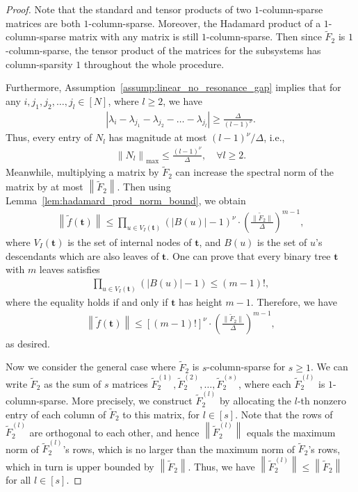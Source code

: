 \documentclass[superscriptaddress,onecolumn,nofootinbib,longbibliography,a4paper,accepted=2026-09-29]{quantumarticle}
\theoremstyle{plain}
\theoremstyle{definition}
\numberwithin{thm}{section}
\numberwithin{assumption}{section}
\numberwithin{lemma}{section}
\numberwithin{prop}{section}
\numberwithin{cor}{section}
\numberwithin{definition}{section}
\numberwithin{rmk}{section}
\numberwithin{equation}{section}
\newcommand{\norm}[1]     {\left\| #1 \right\|}
\newcommand{\lrb}[1]{\left ( #1 \right )}
\newcommand{\mbt}{\mathbf{t}}
\begin{document}
\begin{proof}
Note that the standard and tensor products of two \(1\)-column-sparse matrices are both \(1\)-column-sparse. Moreover, the Hadamard product of a \(1\)-column-sparse matrix with any matrix is still \(1\)-column-sparse. Then since \( \tilde{F}_2 \) is \(1\)-column-sparse, the tensor product of the matrices for the subsystems has column-sparsity $1$ throughout the whole procedure.

Furthermore, Assumption~\ref{assump:linear_no_resonance_gap} implies that for any $i, j_1,j_2,\dots,j_l \in [N]$, where $l \ge 2$, we have 
\begin{align}
|\lambda_i - \lambda_{j_1}-\lambda_{j_2}-\dots-\lambda_{j_l}|\ge  \frac{\Delta}{(l-1)^{\nu}}.    
\end{align}
Thus, every entry of \( N_l \) has magnitude at most \( (l-1)^\nu/\Delta \), i.e., 
\begin{align}
\norm{N_l}_{\mathrm{max}} \le \frac{(l-1)^\nu}{\Delta}, \quad \forall l \ge 2 .     
\end{align}
Meanwhile, multiplying a matrix by $\tilde{F}_2$ can increase the spectral norm of the matrix by at most $\norm{\tilde{F}_2}$. Then using Lemma~\ref{lem:hadamard_prod_norm_bound}, we obtain 
\begin{align}
\norm{ \tilde{f}(\mbt)} \le    \prod_{u \in V_I(\mbt)} (|B(u)|-1)^\nu \cdot \lrb{ \frac{\| \tilde{F}_2 \|}{\Delta} }^{m-1},
\end{align}
where $V_I(\mbt)$ is the set of internal nodes of $\mbt$, and $B(u)$ is the set of $u$'s descendants which are also leaves of $\mbt$. 
One can prove that every binary tree $\mbt$ with $m$ leaves satisfies
\begin{align}
\prod_{u \in V_I(\mbt)} (|B(u)|-1)  \le (m-1)!, 
\end{align}
where the equality holds if and only if $\mbt$ has height $m-1$. Therefore, we have
\begin{align}
\norm{ \tilde{f}(\mbt)} \le  [(m-1)!]^\nu \cdot \lrb{ \frac{\| \tilde{F}_2 \|}{\Delta} }^{m-1},
\end{align}
as desired.

Now we consider the general case where $\tilde{F}_2$ is $s$-column-sparse for $s \ge 1$. We can write $\tilde{F}_2$ as the sum of $s$ matrices $\tilde{F}_2^{(1)}, \tilde{F}_2^{(2)}, \dots, \tilde{F}_2^{(s)}$,
where each $\tilde{F}_2^{(l)}$ is $1$-column-sparse. More precisely, we construct $\tilde{F}_2^{(l)}$ by allocating the $l$-th nonzero entry of each column of $\tilde{F}_2$ to this matrix, for $l \in [s]$. Note that the rows of $\tilde{F}_2^{(l)}$ are orthogonal to each other, and hence $\norm{\tilde{F}_2^{(l)}}$ equals the maximum norm of $\tilde{F}_2^{(l)}$'s rows, which is no larger than the maximum norm of $\tilde{F}_2$'s rows, which in turn is upper bounded by $\norm{\tilde{F}_2}$. Thus, we have $\norm{\tilde{F}_2^{(l)}} \le \norm{\tilde{F}_2}$ for all $l \in [s]$. 


\end{proof}
\end{document}
